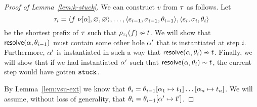 

\begin{proof}[Proof of Lemma~\ref{lem:k-stuck}]
  We can construct $v$ from $\tau$ as follows.
  Let
  $$
  \tau_i = \langle f\ \nu[\alpha], \varnothing, \varnothing \rangle,
             \ldots,
             \langle e_{i-1}, \sigma_{i-1}, \theta_{i-1} \rangle,
             \langle e_{i}, \sigma_{i}, \theta_{i} \rangle
  $$
  be the shortest prefix of $\tau$ such that
  $\rho_{\tau_i}(f) \nsim t$.
  We will show that $\mathsf{resolve}(\alpha, \theta_{i-1})$
  must contain some other hole $\alpha'$ that is
  instantiated at step $i$.
  Furthermore, $\alpha'$ is instantiated in such a way that
  $\mathsf{resolve}(\alpha, \theta_{i}) \nsim t$.
  Finally, we will show that if we had instantiated $\alpha'$ such that
  $\mathsf{resolve}(\alpha, \theta_{i}) \sim t$, the current
  step would have gotten $\mathtt{stuck}$.

  By Lemma~\ref{lem:vsu-ext} we know that
  $\theta_{i} = \theta_{i-1}[\alpha_1 \mapsto t_1] \ldots [\alpha_n \mapsto t_n]$.
  We will assume, without loss of generality, that
  $\theta_{i} = \theta_{i-1}[\alpha' \mapsto t']$.


\end{proof}
